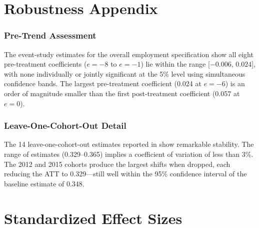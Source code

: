 \documentclass[12pt]{article}
\begin{document}
\section{Robustness Appendix}

\subsubsection*{Pre-Trend Assessment} The event-study estimates for the overall employment specification show all eight pre-treatment coefficients ($e = -8$ to $e = -1$) lie within the range [$-0.006$, $0.024$], with none individually or jointly significant at the 5\% level using simultaneous confidence bands. The largest pre-treatment coefficient (0.024 at $e = -6$) is an order of magnitude smaller than the first post-treatment coefficient (0.057 at $e = 0$).

\subsubsection*{Leave-One-Cohort-Out Detail} The 14 leave-one-cohort-out estimates reported in  show remarkable stability. The range of estimates (0.329--0.365) implies a coefficient of variation of less than 3\%. The 2012 and 2015 cohorts produce the largest shifts when dropped, each reducing the ATT to 0.329---still well within the 95\% confidence interval of the baseline estimate of 0.348.


\section{Standardized Effect Sizes}
\label{sec:sde}


\end{document}
